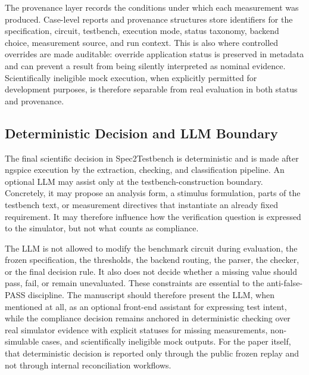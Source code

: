 The provenance layer records the conditions under which each measurement was produced. Case-level reports and provenance structures store identifiers for the specification, circuit, testbench, execution mode, status taxonomy, backend choice, measurement source, and run context. This is also where controlled overrides are made auditable: override application status is preserved in metadata and can prevent a result from being silently interpreted as nominal evidence. Scientifically ineligible mock execution, when explicitly permitted for development purposes, is therefore separable from real evaluation in both status and provenance.

\subsection{Deterministic Decision and LLM Boundary}
The final scientific decision in Spec2Testbench is deterministic and is made after ngspice execution by the extraction, checking, and classification pipeline. An optional LLM may assist only at the testbench-construction boundary. Concretely, it may propose an analysis form, a stimulus formulation, parts of the testbench text, or measurement directives that instantiate an already fixed requirement. It may therefore influence how the verification question is expressed to the simulator, but not what counts as compliance.

The LLM is not allowed to modify the benchmark circuit during evaluation, the frozen specification, the thresholds, the backend routing, the parser, the checker, or the final decision rule. It also does not decide whether a missing value should pass, fail, or remain unevaluated. These constraints are essential to the anti-false-PASS discipline. The manuscript should therefore present the LLM, when mentioned at all, as an optional front-end assistant for expressing test intent, while the compliance decision remains anchored in deterministic checking over real simulator evidence with explicit statuses for missing measurements, non-simulable cases, and scientifically ineligible mock outputs. For the paper itself, that deterministic decision is reported only through the public frozen replay and not through internal reconciliation workflows.

